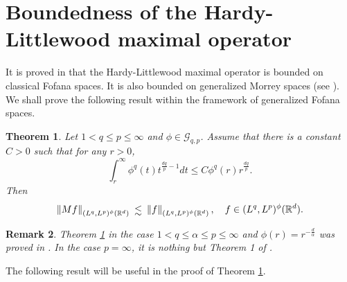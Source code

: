 \documentclass[a4paper,12pt,intlimits,oneside]{amsart}
\numberwithin{equation}{section}
\newtheorem{theorem}{Theorem}[section]
\newtheorem{remark}[theorem]{Remark}
\numberwithin{equation}{section}
\def\lsim{\raisebox{-1ex}{$~\stackrel{\textstyle <}{\sim}~$}}
\theoremstyle{definition}
\begin{document}
\section{Boundedness of the Hardy-Littlewood maximal operator}
It is proved in \cite{JF} that the Hardy-Littlewood maximal operator is bounded on classical Fofana spaces. It is also bounded on generalized Morrey spaces (see \cite{EN}). We shall prove the following result within the framework of generalized Fofana spaces. 
\begin{theorem}\label{theo 1}
 Let $1 < q\leq p \leq \infty$ and $\phi\in \mathcal{G}_{q,p}$. Assume that there is a constant $ C > 0 $ such that for any $ r >0 $, 
  \begin{equation}\label{eqq 2}
 \displaystyle\int_{r}^{\infty} \phi^{q}(t)t^{\frac{dq}{p}-1} dt \leq C   \phi^{q}(r)r^{\frac{dq}{p}}.
  \end{equation}
  Then $$\left\Vert Mf \right\Vert_{(L^{q},L^{p})^{\phi}(\mathbb{R}^{d})} \lsim  \left\Vert f  \right\Vert_{(L^{q},L^{p})^{\phi}(\mathbb{R}^{d})}, \quad f \in (L^{q},L^{p})^{\phi}(\mathbb{R}^{d}).$$
\end{theorem}
\begin{remark}
Theorem \ref{theo 1} in the case $1<q \leq \alpha \leq  p\leq \infty$ and $\phi (r) = r^{-\frac{d}{\alpha}}$ was proved in   \cite[Proposition 4.2 (1)]{JF}.  In the case $p=\infty$, it is nothing but Theorem 1 of \cite{EN}. \label{R10}
\end{remark}

The following result will be useful in the proof of Theorem \ref{theo 1}.
\end{document}
